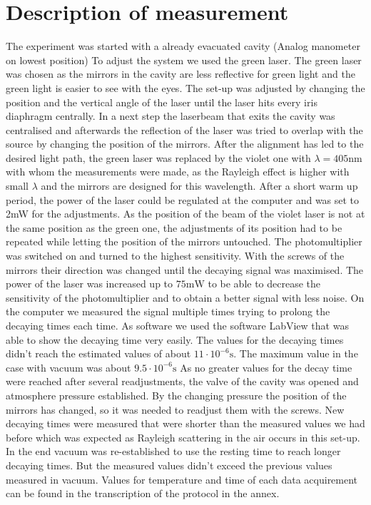 \documentclass[
	parskip=half,10pt,
	numbers= noenddot, %
	toc=flat, %
	oneside,
	twocolumn,
	]{scrartcl}
\begin{document}
\section{Description of measurement}
The experiment was started with a already evacuated cavity (Analog manometer on lowest position)
To adjust the system we used the green laser. The green laser was chosen as the mirrors in the cavity are less reflective for green light and the green light is easier to see with the eyes. The set-up was adjusted by changing the position and the vertical angle of the laser until the laser hits every iris diaphragm centrally. In a next step the laserbeam that exits the cavity was centralised and afterwards the reflection of the laser was tried to overlap with the source by changing the position of the mirrors. After the alignment has led to the desired light path, the green laser was replaced by the violet one with $\lambda=405\si{\nano \meter}$ with whom the measurements were made, as the Rayleigh effect is higher with small $\lambda$ and the mirrors are designed for this wavelength. After a short warm up period, the power of the laser could be regulated at the computer and was set to 2mW for the adjustments. As the position of the beam of the violet laser is not at the same position as the green one, the adjustments of its position had to be repeated while letting the position of the mirrors untouched.
The photomultiplier was switched on and turned to the highest sensitivity. With the screws of the mirrors their direction was changed until the decaying signal was maximised.
The power of the laser was increased up to $75\si{\milli \watt}$ to be able to decrease the sensitivity of the photomultiplier and to obtain a better signal with less noise.
On the computer we measured the signal multiple times trying to prolong the decaying times each time. As software we used the software LabView that was able to show the decaying time very easily. The values for the decaying times didn't reach the estimated values of about $11\cdot 10^{-6}\si{\second}$. The maximum value in the case with vacuum was about $9.5\cdot 10^{-6}\si{\second}$
As no greater values for the decay time were reached after several readjustments, the valve of the cavity was opened and atmosphere pressure established. By the changing pressure the position of the mirrors has changed, so it was needed to readjust them with the screws.
New decaying times were measured that were shorter than the measured values we had before which was expected as Rayleigh scattering in the air occurs in this set-up.
In the end vacuum was re-established to use the resting time to reach longer decaying times. But the measured values didn't exceed the previous values measured in vacuum. 
Values for temperature and time of each data acquirement can be found in the transcription of the protocol in the annex.
\end{document}
